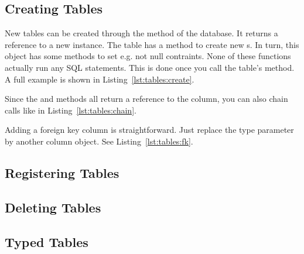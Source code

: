 
\subsection{Creating Tables}
\label{section:tables:create}

New tables can be created through the  method of the database. It returns a reference to a new  instance. The table has a method to create new s. In turn, this object has some methods to set e.g. not null contraints. None of these functions actually run any SQL statements. This is done once you call the table's  method.  A full example is shown in Listing~\ref{lst:tables:create}.



Since the  and  methods all return a reference to the column, you can also chain calls like in Listing~\ref{lst:tables:chain}.



Adding a foreign key column is straightforward. Just replace the type parameter by another column object. See Listing~\ref{lst:tables:fk}.



\subsection{Registering Tables}
\label{section:tables:register}


\subsection{Deleting Tables}
\label{section:tables:delete}


\subsection{Typed Tables}
\label{section:tables:typed}

